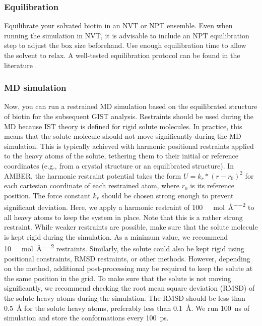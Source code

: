 \documentclass[9pt,tutorial]{livecoms}
\begin{document}
\subsubsection{Equilibration}
Equilibrate your solvated biotin in an NVT or NPT ensemble.
Even when running the simulation in NVT, it is advisable to include an NPT equilibration step to adjust the box size beforehand.
Use enough equilibration time to allow the solvent to relax. 
A well-tested equilibration protocol can be found in the literature \cite{Roe2020-equilibration}.

\subsubsection{MD simulation}
\label{sec:md_simulation}
Now, you can run a restrained MD simulation based on the equilibrated structure of biotin for the subsequent GIST analysis.
Restraints should be used during the MD because IST theory is defined for rigid solute molecules.
In practice, this means that the solute molecule should not move significantly during the MD simulation.
This is typically achieved with harmonic positional restraints applied to the heavy atoms of the solute, tethering them to their initial or reference coordinates (e.g., from a crystal structure or an equilibrated structure). 
In AMBER,  the harmonic restraint potential takes the form $U = k_r * (r - r_0)^2$ for each cartesian coordinate of each restrained atom, where $r_0$ is its reference position. 
The force constant $k_r$ should be chosen strong enough to prevent significant deviation.
Here, we apply a harmonic restraint of \qty{100}{\kilo\calorie\per\mole\per\angstrom\squared} to all heavy atoms to keep the system in place. 
Note that this is a rather strong restraint. 
While weaker restraints are possible, make sure that the solute molecule is kept rigid during the simulation. 
As a minimum value, we recommend \qty{10}{\kilo\calorie\per\mole\per\angstrom\squared} restraints.
Similarly, the solute could also be kept rigid using positional constraints, RMSD restraints, or other methods.
However, depending on the method, additional post-processing may be required to keep the solute at the same position in the grid.
To make sure that the solute is not moving significantly, we recommend checking the root mean square deviation (RMSD) of the solute heavy atoms during the simulation.
The RMSD should be less than \qty{0.5}{\angstrom} for the solute heavy atoms, preferably less than \qty{0.1}{\angstrom}.
We run \qty{100}{\nano\second} of simulation and store the conformations every \qty{100}{\pico\second}.
\end{document}
